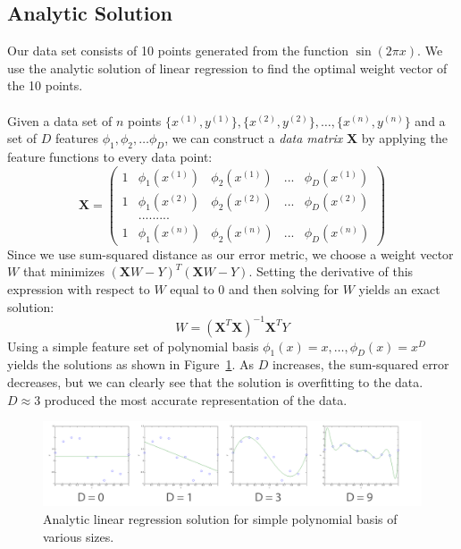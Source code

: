 \documentclass[11pt]{article}   %
\theoremstyle{plain}
\begin{document}
\subsection{Analytic Solution}
Our data set consists of 10 points generated from the function $\sin(2 \pi x)$. We  use the analytic solution of linear regression to find the optimal weight vector of the 10 points. \\
\\
\indent Given a data set of $n$ points $\{ x^{(1)}, y^{(1)} \}, \{ x^{(2)}, y^{(2)} \}, \ldots, \{ x^{(n)}, y^{(n)} \}$ and a set of $D$ features $\phi_1, \phi_2, \ldots \phi_D$, we can construct a \textit{data matrix} \textbf{X} by applying the feature functions to every data point: \\
	 \[ \textbf{X} = \left( \begin{array}{ccccc}
1 & \phi_1(x^{(1)}) & \phi_2(x^{(1)}) & ... & \phi_D(x^{(1)}) \\
1 & \phi_1(x^{(2)}) & \phi_2(x^{(2)}) & ... & \phi_D(x^{(2)}) \\
& ......... \\
1 & \phi_1(x^{(n)}) & \phi_2(x^{(n)}) & ... & \phi_D(x^{(n)}) \end{array} \right)\] 
Since we use sum-squared distance as our error metric, we choose a weight vector $W$ that minimizes $(\textbf{X}W - Y)^T (\textbf{X}W - Y)$. Setting the derivative of this expression with respect to $W$ equal to 0 and then solving for $W$ yields an exact solution:
\begin{equation}
	W = (\textbf{X}^T\textbf{X})^{-1}\textbf{X}^{T}Y
\end{equation}
\indent Using a simple feature set of polynomial basis $\phi_1(x) = x,\ldots,\phi_D(x) = x^D$ yields the solutions as shown in Figure~\ref{fig-analytic}. As $D$ increases, the sum-squared error decreases, but we can clearly see that the solution is overfitting to the data. $D \approx 3$ produced the most accurate representation of the data. 
\begin{figure}[h!]\label{fig-analytic}
  \caption{Analytic linear regression solution for simple polynomial basis of various sizes.}
  \centering
    \includegraphics[width=1.0\textwidth]{figures/problem_2_1_full.png}
\end{figure}
\end{document}
